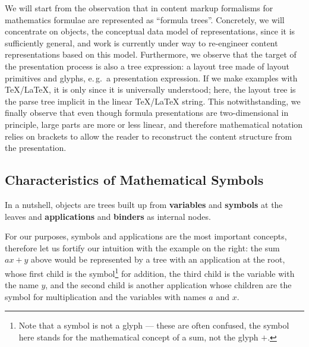 \documentclass[a4paper]{article}
\def\defemph#1{{\bf{#1}}}
\begin{document}
We will start from the observation that in content markup formalisms for mathematics
formulae are represented as ``formula trees''. Concretely, we will concentrate on
{\openmath} objects, the conceptual data model of {\openmath} representations, since it is
sufficiently general, and work is currently under way to re-engineer content {\mathml}
representations based on this model. Furthermore, we observe that the target of the
presentation process is also a tree expression: a layout tree made of layout primitives
and glyphs, e.\,g.\ a presentation {\mathml} expression. If we make examples with
{\TeX/\LaTeX}, it is only since it is universally understood; here, the layout tree is the
parse tree implicit in the linear {\TeX/\LaTeX} string. This notwithstanding, we finally
observe that even though formula presentations are two-dimensional in principle, large
parts are more or less linear, and therefore mathematical notation relies on brackets to
allow the reader to reconstruct the content structure from the presentation.

\subsection{Characteristics of Mathematical Symbols}\label{sec:characteristics}

In a nutshell, {\openmath} objects are trees built up from {\defemph{variables}} and
{\defemph{symbols}} at the leaves and {\defemph{applications}} and {\defemph{binders}} as internal
nodes. 

\begin{figure}\vspace*{-.5em}
\vspace*{-.5em}
\end{figure}
For our purposes, symbols and applications are the most important concepts,
therefore let us fortify our intuition with the example on the right: the sum $ax+y$ above
would be represented by a tree with an application at the root, whose first child is the
symbol\footnote{Note that a symbol is not a glyph --- these are often confused, the symbol
  here stands for the mathematical concept of a sum, not the glyph $+$.} for addition, the
third child is the variable with the name $y$, and the second child is another application
whose children are the symbol for multiplication and the variables with names $a$ and $x$.
\end{document}
